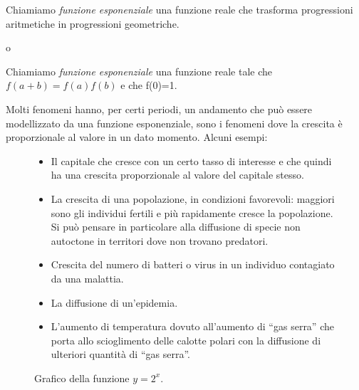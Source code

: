 
\begin{definizione}
Chiamiamo \emph{funzione esponenziale} una funzione reale che trasforma 
progressioni aritmetiche in progressioni geometriche.

o

Chiamiamo \emph{funzione esponenziale} una funzione reale tale che 
\(f(a+b)=f(a)f(b)\) e che f(0)=1.
\end{definizione}

Molti fenomeni hanno, per certi periodi, un andamento che può essere 
modellizzato da una funzione esponenziale, sono i fenomeni dove la crescita 
è 
proporzionale al valore in un dato momento. Alcuni esempi:

\begin{figure}[h]
 \centering
 \begin{minipage}[]{.46\textwidth}
\begin{itemize}
\small 
 \item 
Il capitale che cresce con un certo tasso di interesse e che quindi ha una 
crescita proporzionale al valore del capitale stesso.
 \item 
La crescita di una popolazione, in condizioni favorevoli: maggiori sono gli 
individui fertili e più rapidamente cresce
la popolazione. Si può pensare in particolare alla diffusione di specie non 
autoctone in 
territori dove non trovano predatori.
 \item 
Crescita del numero di batteri o virus in un 
individuo contagiato da una malattia.
 \item 
La diffusione di un'epidemia.
 \item 
L'aumento di temperatura dovuto all'aumento di ``gas serra'' che porta allo 
scioglimento delle calotte polari con la diffusione di ulteriori quantità 
di 
``gas serra''.
\end{itemize}

\end{minipage} \quad
\begin{minipage}[]{.48\textwidth}
\begin{center}
\begin{inaccessibleblock}
  \graficoesponenziale
  \caption{Grafico della funzione \(y=2^x\).} \label{fig:funx2^x}
\end{inaccessibleblock}
\end{center}
\end{minipage}
\end{figure}

